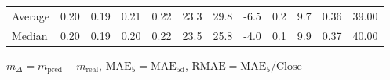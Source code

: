 \begin{threeparttable}
{\begin{tabular}{lrrrrrrrrrrr}
Average &          0.20 &          0.19 &          0.21 &        0.22 &                23.3 &                29.8 &       -6.5 &                 0.2 &              9.7 &            0.36 &                  39.00 \\
 Median &          0.20 &          0.19 &          0.20 &        0.22 &                23.5 &                25.8 &       -4.0 &                 0.1 &              9.9 &            0.37 &                  40.00 \\
\bottomrule
\end{tabular}
}
\begin{tablenotes}\footnotesize
\item $m_\Delta=m_{\text{pred}}-m_{\text{real}}$,
$\mathrm{MAE}_5=\mathrm{MAE}_{5\text{d}}$,
$\mathrm{RMAE}=\mathrm{MAE}_5/\text{Close}$
\end{tablenotes}
\end{threeparttable}
\endgroup


